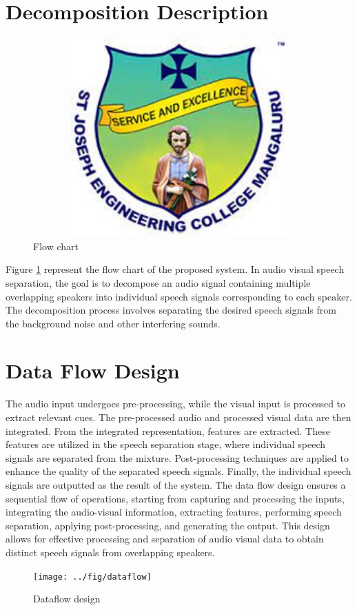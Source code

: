 \documentclass[12pt,a4paper]{report}
\begin{document}
\section{Decomposition Description}
\begin{figure}[hbtp]
\centering
\includegraphics[width=5in,height=3in]{./pic/sjeclogo.png}
\caption{Flow chart}
\label{fig:pic2}
\end{figure}
\newpage
Figure \ref{fig:pic2} represent the flow chart of the proposed system. In audio visual speech separation, the goal is to decompose an audio signal containing multiple overlapping speakers into individual speech signals corresponding to each speaker. The decomposition process involves separating the desired speech signals from the background noise and other interfering sounds.

\section{Data Flow Design}
\par
The audio input undergoes pre-processing, while the visual input is processed to extract relevant cues. The pre-processed audio and processed visual data are then integrated. From the integrated representation, features are extracted. These features are utilized in the speech separation stage, where individual speech signals are separated from the mixture. Post-processing techniques are applied to enhance the quality of the separated speech signals. Finally, the individual speech signals are outputted as the result of the system. The data flow design ensures a sequential flow of operations, starting from capturing and processing the inputs, integrating the audio-visual information, extracting features, performing speech separation, applying post-processing, and generating the output. This design allows for effective processing and separation of audio visual data to obtain distinct speech signals from overlapping speakers.
\\
\begin{figure}[hbtp]
\centering
\texttt{[image: ../fig/dataflow]}
\caption{Dataflow design}
\end{figure}
\end{document}
